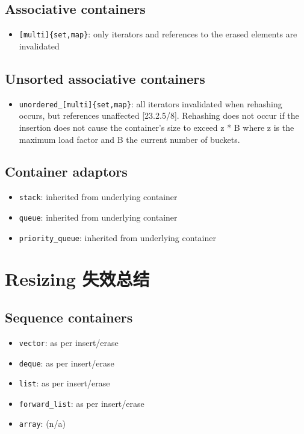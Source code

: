 \documentclass[UTF8,a4paper,12pt]{ctexbook}
\begin{document}
		\subsection{Associative containers}
			\begin{itemize}
				\item \verb|[multi]{set,map}|:  only iterators and references to the erased elements are invalidated 
			\end{itemize}
		\subsection{Unsorted associative containers}
			\begin{itemize}
				\item \verb|unordered_[multi]{set,map}|: all iterators invalidated when rehashing occurs, but references unaffected [23.2.5/8]. Rehashing does not occur if the insertion does not cause the container's size to exceed z * B where z is the maximum load factor and B the current number of buckets.
			\end{itemize}
		
		\subsection{Container adaptors}
			\begin{itemize}
				\item \verb|stack|: inherited from underlying container
				\item \verb|queue|: inherited from underlying container
				\item \verb|priority_queue|: inherited from underlying container
			\end{itemize}

	\section{Resizing 失效总结}
		\subsection{Sequence containers}
			\begin{itemize}
				\item \verb|vector|: as per insert/erase 
				\item \verb|deque|: as per insert/erase 
				\item \verb|list|: as per insert/erase   
				\item \verb|forward_list|: as per insert/erase 
				\item \verb|array|: (n/a)
			\end{itemize}
\end{document}
